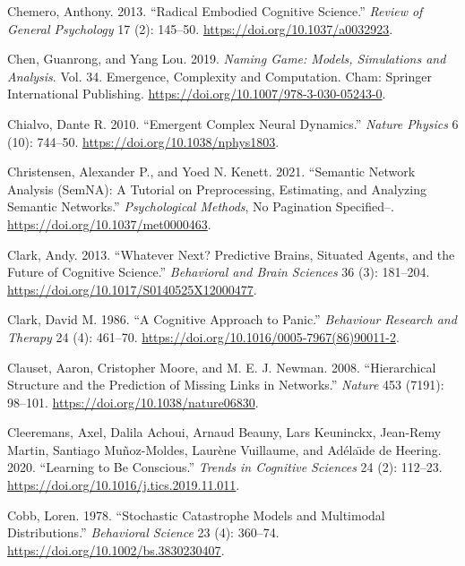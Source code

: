 \documentclass[
  a4paper,
  DIV=11,
  numbers=noendperiod,
  oneside]{scrreprt}
\newlength{\cslhangindent}
\newenvironment{CSLReferences}[2] %
 {\begin{list}{}{%
  \setlength{\itemindent}{0pt}
  \setlength{\leftmargin}{0pt}
  \setlength{\parsep}{0pt}
  \ifodd #1
   \setlength{\leftmargin}{\cslhangindent}
   \setlength{\itemindent}{-1\cslhangindent}
  \fi
  \setlength{\itemsep}{#2\baselineskip}}}
 {\end{list}}
\begin{document}
\begin{CSLReferences}{1}{0}
Chemero, Anthony. 2013. {``Radical {Embodied Cognitive Science}.''}
\emph{Review of General Psychology} 17 (2): 145--50.
\url{https://doi.org/10.1037/a0032923}.

Chen, Guanrong, and Yang Lou. 2019. \emph{Naming {Game}: {Models},
{Simulations} and {Analysis}}. Vol. 34. Emergence, {Complexity} and
{Computation}. {Cham}: {Springer International Publishing}.
\url{https://doi.org/10.1007/978-3-030-05243-0}.

Chialvo, Dante R. 2010. {``Emergent Complex Neural Dynamics.''}
\emph{Nature Physics} 6 (10): 744--50.
\url{https://doi.org/10.1038/nphys1803}.

Christensen, Alexander P., and Yoed N. Kenett. 2021. {``Semantic Network
Analysis ({SemNA}): {A} Tutorial on Preprocessing, Estimating, and
Analyzing Semantic Networks.''} \emph{Psychological Methods}, No
Pagination Specified--. \url{https://doi.org/10.1037/met0000463}.

Clark, Andy. 2013. {``Whatever Next? {Predictive} Brains, Situated
Agents, and the Future of Cognitive Science.''} \emph{Behavioral and
Brain Sciences} 36 (3): 181--204.
\url{https://doi.org/10.1017/S0140525X12000477}.

Clark, David M. 1986. {``A Cognitive Approach to Panic.''}
\emph{Behaviour Research and Therapy} 24 (4): 461--70.
\url{https://doi.org/10.1016/0005-7967(86)90011-2}.

Clauset, Aaron, Cristopher Moore, and M. E. J. Newman. 2008.
{``Hierarchical Structure and the Prediction of Missing Links in
Networks.''} \emph{Nature} 453 (7191): 98--101.
\url{https://doi.org/10.1038/nature06830}.

Cleeremans, Axel, Dalila Achoui, Arnaud Beauny, Lars Keuninckx,
Jean-Remy Martin, Santiago Muñoz-Moldes, Laurène Vuillaume, and Adélaı̈de
de Heering. 2020. {``Learning to Be Conscious.''} \emph{Trends in
Cognitive Sciences} 24 (2): 112--23.
\url{https://doi.org/10.1016/j.tics.2019.11.011}.

Cobb, Loren. 1978. {``Stochastic Catastrophe Models and Multimodal
Distributions.''} \emph{Behavioral Science} 23 (4): 360--74.
\url{https://doi.org/10.1002/bs.3830230407}.


\end{CSLReferences}
\end{document}
